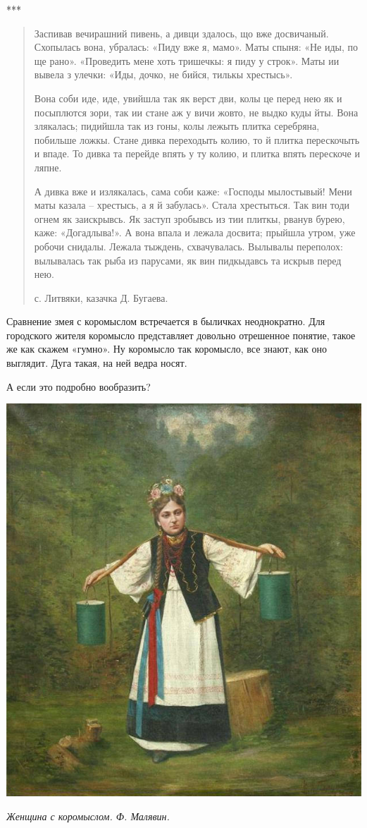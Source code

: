 \begin{center}
***\end{center}

\begin{quotation}
Заспивав вечирашний пивень, а дивци здалось, що вже досвичаный. Схопылась вона, убралась: «Пиду вже я, мамо». Маты спыня: «Не иды, по ще рано». «Проведить мене хоть тришечкы: я пиду у строк». Маты ии вывела з улечки: «Иды, дочко, не бийся, тилькы хрестысь».

Вона соби иде, иде, увийшла так як верст дви, колы це перед нею як и посыплются зори, так ии стане аж у вичи жовто, не выдко куды йты. Вона злякалась; пидийшла так из гоны, колы лежыть плитка серебряна, побильше ложкы. Стане дивка переходыть колию, то й плитка перескочыть и впаде. То дивка та перейде впять у ту колию, и плитка впять перескоче и ляпне.

А дивка вже и излякалась, сама соби каже: «Господы мылостывый! Мени маты казала – хрестысь, а я й забулась». Стала хрестыться. Так вин тоди огнем як заискрывсь. Як заступ зробывсь из тии плиткы, рванув бурею, каже: «Догадлыва!». А вона впала и лежала досвита; прыйшла утром, уже робочи снидалы. Лежала тыждень, схвачувалась. Вылывалы переполох: вылывалась так рыба из парусами, як вин пидкыдавсь та искрыв перед нею.

с. Литвяки, казачка Д. Бугаева.
\end{quotation}
 
Сравнение змея с коромыслом встречается в быличках неоднократно. Для городского жителя коромысло представляет довольно отрешенное понятие, такое же как скажем «гумно». Ну коромысло так коромысло, все знают, как оно выглядит. Дуга такая, на ней ведра носят.

А если это подробно вообразить?
\begin{center}
\includegraphics[width=0.50\linewidth]{chast-zmiy/ktotakiezmei/koromyslo_malyavin.jpg}

\textit{Женщина с коромыслом. Ф. Малявин.}
\end{center}
\newpage

